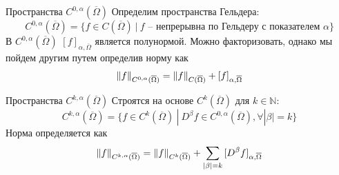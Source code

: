 \documentclass[12pt,a4paper]{article}
\newcommand{\Natural}{\mathbb{N}}
\begin{document}
\begin{definition}{Пространства $C^{0, \alpha} (\overline{\Omega})$}{}
	Определим пространства Гельдера:
	\begin{equation*}
		C^{0, \alpha} (\overline{\Omega}) = \{ f \in C(\overline{\Omega}) \ | \ f \text{ -- непрерывна по Гельдеру с показателем } \alpha\}
	\end{equation*}
	В $C^{0, \alpha} (\overline{\Omega})$ $[f]_{\alpha, \overline{\Omega}}$ является полунормой. Можно факторизовать, однако мы пойдем другим путем определив норму как
	\begin{equation*}
		\norm{f}_{C^{0, \alpha} (\overline{\Omega})} = \norm{f}_{C(\overline{\Omega})} + [f]_{\alpha, \overline{\Omega}}
	\end{equation*}
\end{definition}

\begin{definition}{Пространства $C^{k, \alpha} (\overline{\Omega})$}{}
	Строятся на основе $C^k (\overline{\Omega})$ для $k \in \Natural$:
	\begin{equation*}
		C^{k, \alpha} (\overline{\Omega}) = \{ f \in C^k (\overline{\Omega}) \ | \ D^\beta f \in C^{0, \alpha} (\overline{\Omega}), \forall |\beta| = k\}
	\end{equation*}
	Норма определяется как
	\begin{equation*}
		\norm{f}_{C^{k, \alpha} (\overline{\Omega})} = \norm{f}_{C^k (\overline{\Omega})} + \sum\limits_{|\beta| = k}{[D^\beta f]_{\alpha, \overline{\Omega}}}
	\end{equation*}
\end{definition}
\end{document}

